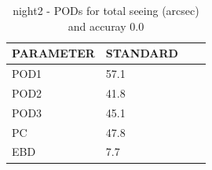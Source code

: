 \begin{table}[p!]
\begin{center}
\begin{tabular}{|l|l|l|l|}
\hline
\multicolumn{1}{|c|}{\cellcolor[HTML]{C0C0C0}\textbf{PARAMETER}} & \multicolumn{1}{c|}{\cellcolor[HTML]{C0C0C0}\textbf{STANDARD}}\\
\hline
\cellcolor[HTML]{C0C0C0}POD1  & 57.1                                \\
\cellcolor[HTML]{C0C0C0}POD2  & 41.8                                \\
\cellcolor[HTML]{C0C0C0}POD3  & 45.1                                \\
\cellcolor[HTML]{C0C0C0}PC    & 47.8                                  \\
\cellcolor[HTML]{C0C0C0}EBD   & 7.7                                 \\
\hline
\end{tabular}
\caption{night2 - PODs for total seeing (arcsec) and accuray 0.0}
\label{tab:podsee0.0:night2}
\end{center}
\end{table}
